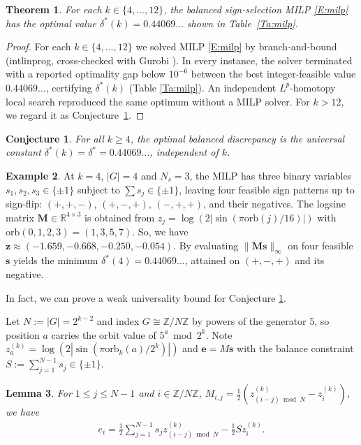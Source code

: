 \documentclass[11pt,a4paper]{article}
\theoremstyle{plain}
\newtheorem{theorem}{Theorem}[section]
\newtheorem{lemma}[theorem]{Lemma}
\newtheorem{conjecture}{Conjecture}
\theoremstyle{definition}
\newtheorem{example}[theorem]{Example}
\theoremstyle{remark}
\newcommand{\Z}{\mathbb{Z}}
\newcommand{\R}{\mathbb{R}}
\begin{document}
\begin{theorem}\label{T:milp}
For each $k\in\{4, \dots, 12\}$, the balanced sign-selection MILP \eqref{E:milp} has the optimal value $\delta^*(k)=0.44069\ldots$ shown in Table~\ref{Ta:milp}. 
\end{theorem}

\begin{proof}
For each $k\in\{4, \dots, 12\}$ we solved MILP \eqref{E:milp} by branch-and-bound (intlinprog, cross-checked with Gurobi \cite{Gurobi}). In every instance, the solver terminated with a reported optimality gap below $10^{-6}$ between the best integer-feasible value $0.44069\ldots$, certifying $\delta^*(k)$ (Table \ref{Ta:milp}). An independent $L^p$-homotopy local search reproduced the same optimum without a MILP solver. For $k>12$, we regard it as Conjecture~\ref{conj:universal}.
\end{proof}

\begin{conjecture}\label{conj:universal}
For all $k\ge4$, the optimal balanced discrepancy is the universal constant $\delta^*(k)=\delta^*=0.44069\ldots$, independent of $k$.
\end{conjecture}


\begin{example}\label{ex:milp-k4}
At $k=4$, $|G|=4$ and $N_s=3$, the MILP has three binary variables $s_1, s_2, s_3\in\{\pm1\}$ subject to $\sum s_j\in\{\pm 1\}$, leaving four feasible sign patterns up to sign-flip: $(+, +, -)$, $(+, -, +)$, $(-, +, +)$, and their negatives. The logsine matrix $\mathbf{M}\in\R^{4\times 3}$ is obtained from $z_j=\log(2|\sin(\pi\mathrm{orb}(j)/16)|)$ with $\mathrm{orb}(0,1,2,3)=(1,3,5,7)$. So, we have $\mathbf{z}\approx(-1.659,-0.668,-0.250,-0.054)$. By evaluating $\|\mathbf{M}\mathbf{s}\|_\infty$ on four feasible $\mathbf{s}$ yields the minimum $\delta^*(4)=0.44069\ldots$, attained on $(+,-,+)$ and its negative. 
\end{example}

In fact, we can prove a weak universality bound for Conjecture \ref{conj:universal}. 

Let $N:=|G|=2^{k-2}$ and index $G\cong\Z/N\Z$ by powers of the generator $5$, so position $a$ carries the orbit value of $5^a\bmod 2^k$. Note $z^{(k)}_a=\log(2|\sin(\pi \mathrm{orb}_k(a)/2^k)|)$ and $\mathbf{e}=M\mathbf{s}$ with the balance constraint $S:=\sum_{j=1}^{N-1}s_j\in\{\pm1\}$.

\begin{lemma}\label{lem:conv}
For $1\le j\le N-1$ and $i\in\Z/N\Z$, $M_{i,j}=\frac{1}{2}(z^{(k)}_{(i-j)\bmod N}-z^{(k)}_i)$, we have 
\begin{align}
  e_i=\frac{1}{2}\sum_{j=1}^{N-1}s_j z^{(k)}_{(i-j)\bmod N}-\frac{1}{2}S z^{(k)}_i.
  \label{E:weakconv}
\end{align}

\end{lemma}
\end{document}
